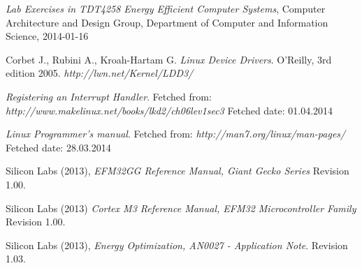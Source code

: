 
\begin{thebibliography}{9}

  \emph{Lab Exercises in TDT4258 Energy Efficient Computer Systems},
  Computer Architecture and Design Group,
  Department of Computer and Information Science,
  2014-01-16

	Corbet J., Rubini A., Kroah-Hartam G.
	\emph{Linux Device Drivers}.
	O'Reilly, 3rd edition 2005.
	\emph{http://lwn.net/Kernel/LDD3/}

	\emph{Registering an Interrupt Handler}.
	Fetched from: \emph{http://www.makelinux.net/books/lkd2/ch06lev1sec3}
	Fetched date: 01.04.2014

	\emph{Linux Programmer's manual}.
	Fetched from: \emph{http://man7.org/linux/man-pages/}
	Fetched date: 28.03.2014

	Silicon Labs (2013),
	\emph{EFM32GG Reference Manual, Giant Gecko Series}
	Revision 1.00.
	
	Silicon Labs (2013)
	\emph{Cortex M3 Reference Manual, EFM32 Microcontroller Family}
	Revision 1.00.

	Silicon Labs (2013),
	\emph{Energy Optimization, AN0027 - Application Note}.
	Revision 1.03.

\end{thebibliography}
